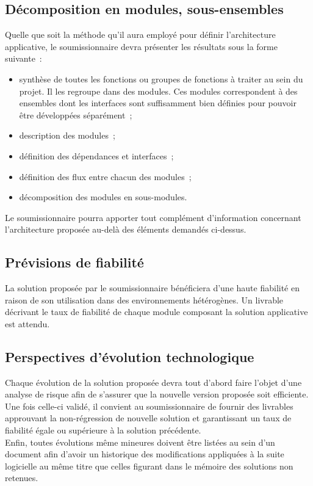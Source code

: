 \subsection{Décomposition en modules, sous-ensembles}
Quelle que soit la méthode qu'il aura employé pour définir l'architecture applicative, le soumissionnaire devra présenter les résultats sous la forme suivante~:
\begin{itemize}
	\item synthèse de toutes les fonctions ou groupes de fonctions à traiter au sein du projet. Il les regroupe dans des modules. Ces modules correspondent à des ensembles dont les interfaces sont suffisamment bien définies pour pouvoir être développées séparément~;
	\item description des modules~;
	\item définition des dépendances et interfaces~;
	\item définition des flux entre chacun des modules~;
	\item décomposition des modules en sous-modules.
\end{itemize}
Le soumissionnaire pourra apporter tout complément d'information concernant l'architecture proposée au-delà des éléments demandés ci-dessus.

\subsection{Prévisions de fiabilité}
La solution proposée par le soumissionnaire bénéficiera d'une haute fiabilité en raison de son utilisation dans des environnements hétérogènes. Un livrable décrivant le taux de fiabilité de chaque module composant la solution applicative est attendu.

\subsection{Perspectives d'évolution technologique}
Chaque évolution de la solution proposée devra tout d'abord faire l'objet d'une analyse de risque afin de s'assurer que la nouvelle version proposée soit efficiente.
\\
Une fois celle-ci validé, il convient au soumissionnaire de fournir des livrables approuvant la non-régression de nouvelle solution et garantissant un taux de fiabilité égale ou supérieure à la solution précédente.
\\
Enfin, toutes évolutions même mineures doivent être listées au sein d'un document afin d'avoir un historique des modifications appliquées à la suite logicielle au même titre que celles figurant dans le mémoire des solutions non retenues.
